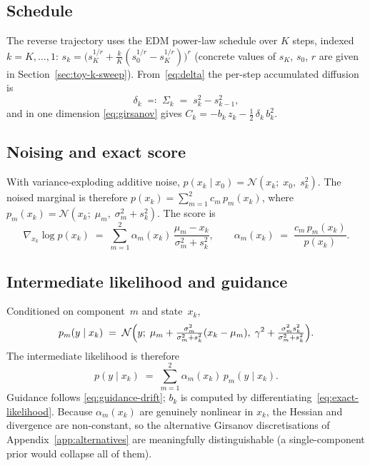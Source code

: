 \documentclass[11pt]{article}
\begin{document}
\subsection{Schedule}

The reverse trajectory uses the EDM power-law schedule \citep{karras2022edm}
over $K$ steps, indexed $k = K,\dots,1$:
$s_k = \bigl(s_K^{1/r} + \frac{k}{K}(s_0^{1/r} - s_K^{1/r})\bigr)^{r}$
(concrete values of $s_K$, $s_0$, $r$ are given in
Section~\ref{sec:toy-k-sweep}).
From~\eqref{eq:delta} the per-step accumulated diffusion is
\begin{equation}\label{eq:toy-delta}
  \delta_k \;\eqqcolon\; \Sigma_k \;=\; s_k^2 - s_{k-1}^2,
\end{equation}
and in one dimension \eqref{eq:girsanov} gives
$C_k = -b_k\,z_k - \tfrac12\,\delta_k\,b_k^2$.

\subsection{Noising and exact score}

With variance-exploding additive noise,
$p(x_k\mid x_0) = \mathcal{N}(x_k;\; x_0,\; s_k^2)$.
The noised marginal is therefore
$p(x_k) = \sum_{m=1}^{2} c_m\,p_m(x_k)$, where
$p_m(x_k) = \mathcal{N}(x_k;\; \mu_m,\; \sigma_m^2 + s_k^2)$.
The score is
\begin{equation}\label{eq:exact-score}
  \nabla_{x_k}\!\log p(x_k)
  \;=\; \sum_{m=1}^{2} \alpha_m(x_k)\,
       \frac{\mu_m - x_k}{\sigma_m^2 + s_k^2},
  \qquad
  \alpha_m(x_k) \;=\;
   \frac{c_m\,p_m(x_k)}
        {p(x_k)}.
\end{equation}

\subsection{Intermediate likelihood and guidance}

Conditioned on component~$m$ and state~$x_k$,
\begin{equation}\label{eq:obs-by-comp}
  p_m(y\mid x_k) \;=\;
    \mathcal{N}\Bigl(y;\;
      \mu_m + \tfrac{\sigma_m^2}{\sigma_m^2+s_k^2}(x_k-\mu_m),\;
      \gamma^2 + \tfrac{\sigma_m^2 s_k^2}{\sigma_m^2+s_k^2}\Bigr).
\end{equation}
The intermediate likelihood is therefore
\begin{equation}\label{eq:exact-likelihood}
  p(y\mid x_k) \;=\; \sum_{m=1}^{2} \alpha_m(x_k)\,
                     p_m(y\mid x_k).
\end{equation}
Guidance follows \eqref{eq:guidance-drift}; $b_k$ is computed by
differentiating~\eqref{eq:exact-likelihood}.
Because $\alpha_m(x_k)$ are genuinely nonlinear in $x_k$,
the Hessian and divergence are non-constant, so the alternative Girsanov
discretisations of Appendix~\ref{app:alternatives} are meaningfully
distinguishable (a single-component prior would collapse all of them).
\end{document}
